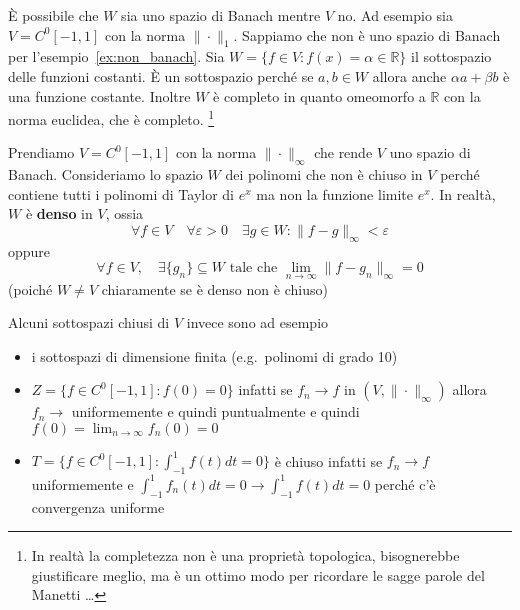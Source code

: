 \begin{example}
    È possibile che \(W\) sia uno spazio di Banach mentre \(V\) no. Ad esempio
    sia \(V = C^{0}[-1, 1]\) con la norma \(\|\cdot \|_1\). Sappiamo che non è
    uno spazio di Banach per l'esempio~\ref{ex:non_banach}. Sia \(W = \{f \in V
    : f{(x)} = \alpha \in \mathbb{R} \} \) il sottospazio delle funzioni
    costanti. È un sottospazio perché se \(a, b \in  W\) allora anche
    \(\alpha a + \beta b\) è una funzione costante. Inoltre \(W\) è completo in
    quanto omeomorfo a \(\mathbb{R}\) con la norma euclidea, che è completo. 
    \footnote{In realtà la completezza non è una proprietà topologica, bisognerebbe giustificare meglio, 
    ma è un ottimo modo per ricordare le sagge parole del Manetti \dots }
\end{example}

\begin{example}
    Prendiamo \(V = C^{0}[-1, 1]\) con la norma \(\|\cdot \|_\infty\) che rende
    \(V\) uno spazio di Banach. Consideriamo lo spazio \(W\) dei polinomi che
    non è chiuso in \(V\) perché contiene tutti i polinomi di Taylor di
    \(e^{x}\) ma non la funzione limite \(e^{x}\). In realtà, \(W\) è
    \textbf{denso} in \(V\), ossia
    \[
        \forall f \in V \quad \forall \varepsilon > 0 \quad \exists g \in W :
        \| f - g\|_\infty < \varepsilon
    \]
    oppure 
    \[
        \forall f \in V, \quad \exists \{g_{n}\} \subseteq W \text{ tale che }
        \lim_{n \to \infty} \| f - g_{n}\|_\infty = 0
    \]
    (poiché \(W \neq V\) chiaramente se è denso non è chiuso) 

    Alcuni sottospazi chiusi di \(V\) invece sono ad esempio
\begin{itemize}[label = --]
    \item i sottospazi di dimensione finita (e.g.~polinomi di grado 10)
    \item \(Z = \{f \in C^{0}[-1, 1]: f{(0)} = 0\}  \) infatti se \(f_{n} \to
        f\) in \({(V, \|\cdot \|_\infty)}\) allora \(f_{n} \to \) uniformemente
        e quindi puntualmente e quindi \(f{(0)} = \lim_{n \to \infty} f_{n}{(0)}
        = 0\)
\item \(T = \{f \in C^{0}[-1, 1] : \int_{-1}^{1} f{(t)}dt = 0\}  \) è chiuso
        infatti se \(f_{n} \to f\) uniformemente e \(\int_{-1}^{1} f_{n}{(t)}dt
        = 0 \to \int_{-1}^{1}f{(t)}dt = 0\) perché c'è convergenza uniforme
\end{itemize}
\end{example}

